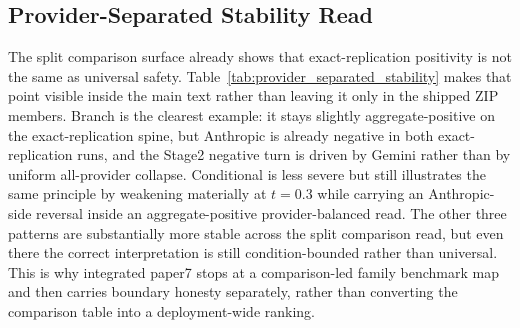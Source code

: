 \documentclass[11pt,a4paper]{article}
\begin{document}
\subsection{Provider-Separated Stability Read}

The split comparison surface already shows that exact-replication positivity is not the same as universal safety. Table~\ref{tab:provider_separated_stability} makes that point visible inside the main text rather than leaving it only in the shipped ZIP members. Branch is the clearest example: it stays slightly aggregate-positive on the exact-replication spine, but Anthropic is already negative in both exact-replication runs, and the Stage2 negative turn is driven by Gemini rather than by uniform all-provider collapse. Conditional is less severe but still illustrates the same principle by weakening materially at \(t=0.3\) while carrying an Anthropic-side reversal inside an aggregate-positive provider-balanced read. The other three patterns are substantially more stable across the split comparison read, but even there the correct interpretation is still condition-bounded rather than universal. This is why integrated paper7 stops at a comparison-led family benchmark map and then carries boundary honesty separately, rather than converting the comparison table into a deployment-wide ranking.
\end{document}
